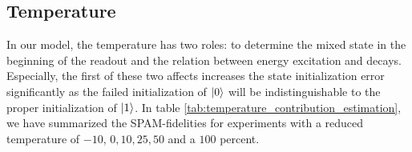 

\subsection{Temperature}
In our model, the temperature has two roles: to determine the mixed state in the beginning of the readout and the relation between energy excitation and decays. Especially, the first of these two affects increases the state initialization error significantly as the failed initialization of $\ket{0}$ will be indistinguishable to the proper initialization of $\ket{1}$. In table \ref{tab:temperature_contribution_estimation}, we have summarized the SPAM-fidelities for experiments with a reduced temperature of $-10$, $0, 10, 25, 50$ and a $100$ percent. 

